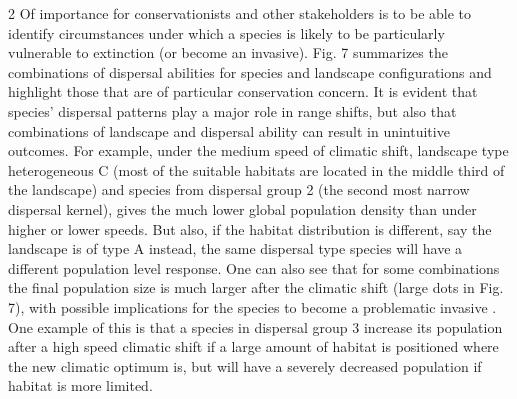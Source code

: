 \documentclass[12pt,pdftex]{article}
\begin{document}
\begin{spacing}{2}
Of importance for conservationists and other stakeholders is to be able to identify circumstances under which a species is likely to be particularly vulnerable to extinction (or become an invasive).  Fig. 7 summarizes the combinations of dispersal abilities for species and landscape configurations and highlight those that are of particular conservation concern. It is evident that species' dispersal patterns play a major role in range shifts, but also that combinations of landscape and dispersal ability can result in unintuitive outcomes. For example, under the medium speed of climatic shift, landscape type heterogeneous C (most of the suitable habitats are located in the middle third of the landscape) and species from dispersal group 2 (the second most narrow dispersal kernel), gives the much lower global population density than under higher or lower speeds. But also, if the habitat distribution is different, say the landscape is of type A instead, the same dispersal type species will have a different population level response. One can also see that for some combinations the final population size is much larger after the climatic shift (large dots in Fig. 7), with possible implications for the species to become a problematic invasive \citep[for a summary of potential mechanisms, see ][]{Hellmann2008}. One example of this is  that a species in dispersal group 3 increase its population after a high speed climatic shift if a large amount of habitat is positioned where the new climatic optimum is, but will have a severely decreased population if habitat is more limited.    



\end{spacing}
\end{document}
